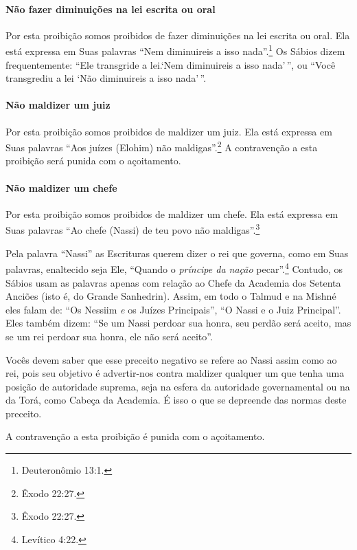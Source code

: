 \paragraph{Não fazer diminuições na lei escrita ou oral}

Por esta proibição somos proibidos de fazer diminuições na lei escrita
ou oral. Ela está expressa em Suas palavras ``Nem diminuireis a isso
nada''.\footnote{Deuteronômio 13:1.} Os Sábios dizem frequentemente: ``Ele
transgride a lei.`Nem diminuireis a isso nada'\,'', ou ``Você transgrediu
a lei `Não diminuireis a isso nada'\,''.

\paragraph{Não maldizer um juiz}

Por esta proibição somos proibidos de maldizer um juiz. Ela está
expressa em Suas palavras ``Aos juízes (Elohim) não maldigas''.\footnote{Êxodo
22:27.} A contravenção a esta proibição será punida com o açoitamento.

\paragraph{Não maldizer um chefe}

Por esta proibição somos proibidos de maldizer um chefe. Ela está
expressa em Suas palavras ``Ao chefe (Nassi) de teu povo não maldigas''.\footnote{Êxodo 22:27.}

Pela palavra ``Nassi'' as Escrituras querem dizer o
rei que governa, como em Suas palavras, enaltecido seja Ele, ``Quando o
\emph{príncipe da nação} pecar''.\footnote{Levítico 4:22.} Contudo, os Sábios
usam as palavras apenas com relação ao Chefe da Academia dos Setenta
Anciões (isto é, do Grande Sanhedrin). Assim, em todo o Talmud e na
Mishné eles falam de: ``Os Nessiim \emph{e} os Juízes Principais'', ``O
Nassi e o Juiz Principal''. Eles também dizem: ``Se um Nassi perdoar
sua honra, seu perdão será aceito, mas se um rei perdoar sua honra, ele
não será aceito''.

Vocês devem saber que esse preceito negativo se refere ao Nassi assim
como ao rei, pois seu objetivo é advertir-nos contra maldizer qualquer
um que tenha uma posição de autoridade suprema, seja na esfera da
autoridade governamental ou na da Torá, como Cabeça da Academia. É
isso o que se depreende das normas deste preceito.

A contravenção a esta proibição é punida com o açoitamento.

